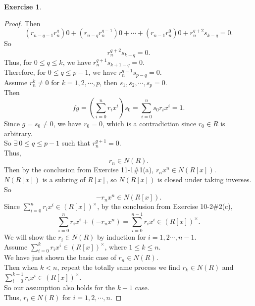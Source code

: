 \documentclass{amsart}
\theoremstyle{plain}
\theoremstyle{definition}
\newtheorem{exer}[lem]{Exercise}
\begin{document}
\begin{exer}
\begin{enumerate}[(a)]
\begin{proof}
	Then 
	\[\left(r_{n-q-1}r_n^{q}\right)0 + \left(r_{n-q}r_n^{q-1}\right)0 + \cdots+ \left(r_{n-1}r_n^{0}\right)0 + r_n^{q+2}s_{k-q} = 0.\]
	So
	\[r_n^{q+2}s_{k-q} = 0.\]
	Thus, for $0 \leq q  \leq  k$, we have $r_n^{q+1}s_{k+1-q} = 0$.\\
	Therefore, for $0 \leq q  \leq  p-1$, we have $r_n^{q+1}s_{p-q} = 0$.\\
	Assume $r_n^k \neq 0$ for $k = 1,2,\cdots,p$, then $s_1,s_{2},\cdots,s_{p} = 0$. \\
	Then 
	\[fg = \left(\sum_{i=0}^nr_ix^i \right) s_0 = \sum_{i=0}^ns_0r_ix^i = 1.\]
	Since $g = s_0\neq 0$, we have $r_0 = 0$, which is a contradiction since $r_0 \in R$ is arbitrary.\\
	So $\exists \ 0\leq q \leq p-1$ such that $r_n^{q+1} = 0$.\\
	Thus,
	\[r_n \in N(R).\]
	Then by the conclusion from Exercise 11-1$\#$1(a), $r_nx^{n} \in N(R[x])$.\\
	$N(R[x])$ is a subring of $R[x]$, so $N(R[x])$ is closed under taking inverses.\\
 	 So 
  	\[-r_nx^{n} \in  N(R[x]).\]
	Since $\sum_{i=0}^{n}r_ix^i \in  (R[x])^{\times}$, by the conclusion from Exercise 10-2$\#$2(c),
	\[\sum_{i=0}^{n}r_ix^i + (-r_nx^{n}) = \sum_{i=0}^{n-1}r_ix^i \in (R[x])^{\times}.\]
	We will show the $r_{i} \in N(R)$ by induction for $i = 1,2\cdots,n-1$.\\
	Assume $\sum_{i=0}^{k}r_ix^i \in (R[x])^{\times}$, where $1\leq k \leq n$.\\
	We have just shown the basic case of $r_n \in N(R)$.\\
	Then when $k < n$, repeat the totally same process we find $r_k \in N(R)$ and $\sum_{i=0}^{k-1}r_ix^i \in (R[x])^{\times}$.\\
	So our assumption also holds for the $k-1$ case.\\
	Thus, $r_i \in N(R)$ for $i = 1,2,\cdots,n$.
	
\end{proof}
\end{enumerate}
\end{exer}
\end{document}
